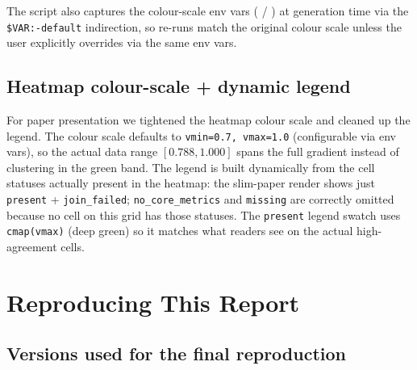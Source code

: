 \documentclass[11pt]{article}
\begin{document}
The script also captures the colour-scale env vars
  ( /
  ) at generation time via the
  \texttt{\${VAR:-default}} indirection, so re-runs match the
  original colour scale unless the user explicitly overrides via the
  same env vars.

\subsection{Heatmap colour-scale + dynamic legend}
\label{sec:tr-tooling-heatmap-ux}

For paper presentation we tightened the heatmap colour scale and
  cleaned up the legend.
The colour scale defaults to \texttt{vmin=0.7, vmax=1.0} (configurable
  via env vars), so the actual data range $[0.788, 1.000]$ spans the
  full gradient instead of clustering in the green band.
The legend is built dynamically from the cell statuses actually
  present in the heatmap: the slim-paper render shows just
  \texttt{present} + \texttt{join\_failed}; \texttt{no\_core\_metrics}
  and \texttt{missing} are correctly omitted because no cell on this
  grid has those statuses.
The \texttt{present} legend swatch uses \texttt{cmap(vmax)} (deep
  green) so it matches what readers see on the actual high-agreement
  cells.


\section{Reproducing This Report}
\label{sec:tr-reproduce}

\subsection{Versions used for the final reproduction}
\label{sec:tr-versions}
\end{document}
